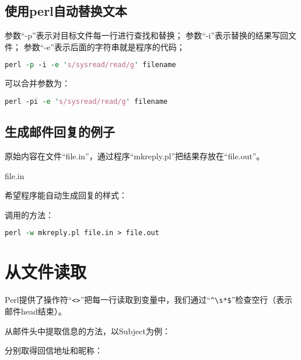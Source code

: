 \subsection{使用perl自动替换文本}

参数“-p”表示对目标文件每一行进行查找和替换；
参数“-i”表示替换的结果写回文件；
参数“-e”表示后面的字符串就是程序的代码；

\begin{lstlisting}[language=Perl]
perl -p -i -e 's/sysread/read/g' filename
\end{lstlisting}

可以合并参数为：

\begin{lstlisting}[language=Perl]
perl -pi -e 's/sysread/read/g' filename
\end{lstlisting}

\subsection{生成邮件回复的例子}

原始内容在文件“file.in”，通过程序“mkreply.pl”把结果存放在“file.out”。

file.in



希望程序能自动生成回复的样式：



调用的方法：

\begin{lstlisting}[language=Perl]
perl -w mkreply.pl file.in > file.out
\end{lstlisting}

\section{从文件读取}

Perl提供了操作符“\verb|<>|”把每一行读取到变量中，我们通过“\verb|^\s*$|”检查空行（表示邮件head结束）。



从邮件头中提取信息的方法，以Subject为例：



分别取得回信地址和昵称：



